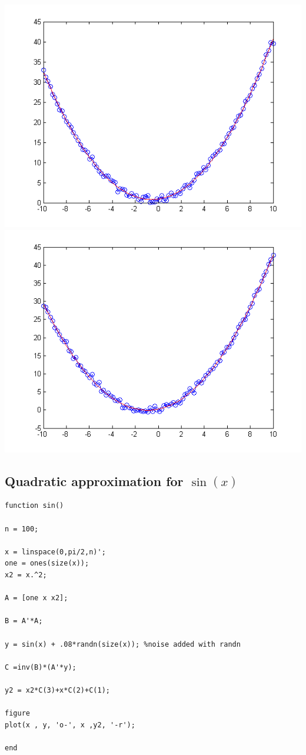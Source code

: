 \documentclass[12pt]{article}
\begin{document}
\includegraphics[scale=.5]{plot3.png}
\includegraphics[scale=.5]{plot4.png}

\subsection*{Quadratic approximation for $\sin(x)$}
\begin{verbatim}
function sin()

n = 100;

x = linspace(0,pi/2,n)';
one = ones(size(x));
x2 = x.^2;

A = [one x x2];

B = A'*A;

y = sin(x) + .08*randn(size(x)); %noise added with randn

C =inv(B)*(A'*y);

y2 = x2*C(3)+x*C(2)+C(1);

figure
plot(x , y, 'o-', x ,y2, '-r');

end
\end{verbatim}
\end{document}
